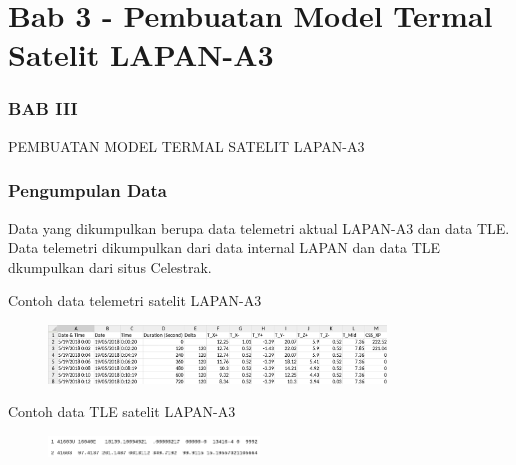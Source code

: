 \documentclass[8pt]{beamer}
\begin{document}
\section{Bab 3 - Pembuatan Model Termal Satelit LAPAN-A3}
\begin{frame}
  \frametitle{BAB III}
  \center \large PEMBUATAN MODEL TERMAL SATELIT LAPAN-A3
\end{frame}
\begin{frame}
  \frametitle{Pengumpulan Data}
  Data yang dikumpulkan berupa data telemetri aktual LAPAN-A3 dan data TLE. Data telemetri dikumpulkan dari data internal LAPAN dan data TLE dkumpulkan dari situs Celestrak.
  \begin{block}{\center Contoh data telemetri satelit LAPAN-A3}
      \begin{figure}
          \includegraphics[width=0.8\textwidth]{figure/telea3.png}
      \end{figure}
    \end{block}
    \begin{block}{\center Contoh data TLE satelit LAPAN-A3}
      \begin{figure}
          \includegraphics[width=0.5\textwidth]{figure/tlea3.png}
      \end{figure}
    \end{block}
\end{frame}
\end{document}
